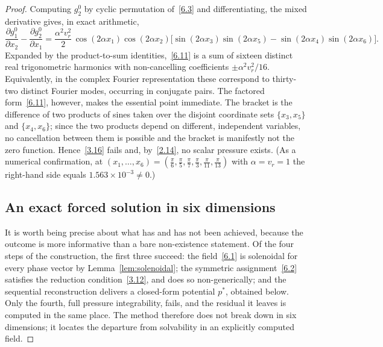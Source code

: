 \documentclass[11pt]{jfm}
\numberwithin{equation}{section}
\begin{document}
\begin{proof}
Computing $g_2^0$ by cyclic permutation of~\eqref{6.3} and differentiating, the mixed
derivative gives, in exact arithmetic,
\begin{equation}
\label{6.11}
\frac{\partial g_1^0}{\partial x_2}-\frac{\partial g_2^0}{\partial x_1}
=\frac{\alpha^2 v_r^2}{2}\,\cos(2\alpha x_1)\cos(2\alpha x_2)
\Big[\sin(2\alpha x_3)\sin(2\alpha x_5)-\sin(2\alpha x_4)\sin(2\alpha x_6)\Big].
\end{equation}
Expanded by the product-to-sum identities,~\eqref{6.11} is a sum of sixteen distinct real
trigonometric harmonics with non-cancelling coefficients $\pm\alpha^2 v_r^2/16$. Equivalently, in
the complex Fourier representation these correspond to thirty-two distinct Fourier modes,
occurring in conjugate pairs. The factored form~\eqref{6.11}, however, makes the essential point
immediate. The bracket is the difference of two products of sines taken over
the disjoint coordinate sets $\{x_3,x_5\}$ and $\{x_4,x_6\}$; since the two products depend on
different, independent variables, no cancellation between them is possible and the bracket is
manifestly not the zero function. Hence~\eqref{3.16} fails and, by~\eqref{2.14}, no scalar
pressure exists. (As a numerical confirmation, at
$(x_1,\dots,x_6)=(\tfrac{\pi}{6},\tfrac{\pi}{5},\tfrac{\pi}{7},\tfrac{\pi}{3},\tfrac{\pi}{11},\tfrac{\pi}{13})$
with $\alpha=v_r=1$ the right-hand side equals $1.563\times10^{-3}\neq0$.)

\subsection{An exact forced solution in six dimensions}
\label{subsec:6D-forced}
It is worth being precise about what has and has not been achieved, because the outcome is more
informative than a bare non-existence statement. Of the four steps of the construction, the first
three succeed: the field~\eqref{6.1} is solenoidal for every phase vector by
Lemma~\ref{lem:solenoidal}; the symmetric assignment~\eqref{6.2} satisfies the reduction
condition~\eqref{3.12}, and does so non-generically; and the sequential reconstruction delivers a
closed-form potential $p^{*}$, obtained below. Only the fourth, full pressure integrability, fails,
and the residual it leaves is computed in the same place. The method therefore does not break down in
six dimensions; it locates the departure from solvability in an explicitly computed field.


\end{proof}
\end{document}
